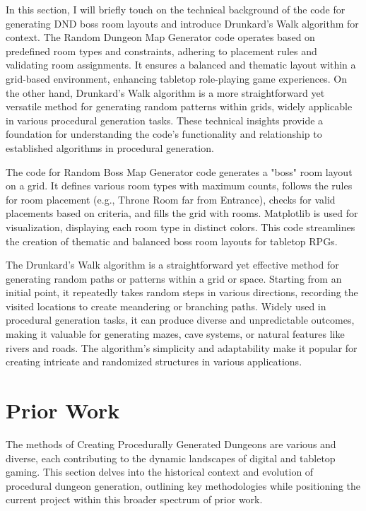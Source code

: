 \documentclass[10pt,twocolumn]{article}
\begin{document}
In this section, I will briefly touch on the technical background of the code for generating DND boss room layouts and introduce Drunkard's Walk algorithm for context. The Random Dungeon Map Generator code operates based on predefined room types and constraints, adhering to placement rules and validating room assignments. It ensures a balanced and thematic layout within a grid-based environment, enhancing tabletop role-playing game experiences. On the other hand, Drunkard's Walk algorithm is a more straightforward yet versatile method for generating random patterns within grids, widely applicable in various procedural generation tasks. These technical insights provide a foundation for understanding the code's functionality and relationship to established algorithms in procedural generation.
 
The code for Random Boss Map Generator code generates a "boss" room layout on a grid. It defines various room types with maximum counts, follows the rules for room placement (e.g., Throne Room far from Entrance), checks for valid placements based on criteria, and fills the grid with rooms. Matplotlib is used for visualization, displaying each room type in distinct colors. This code streamlines the creation of thematic and balanced boss room layouts for tabletop RPGs.

The Drunkard's Walk algorithm is a straightforward yet effective method for generating random paths or patterns within a grid or space. Starting from an initial point, it repeatedly takes random steps in various directions, recording the visited locations to create meandering or branching paths. Widely used in procedural generation tasks, it can produce diverse and unpredictable outcomes, making it valuable for generating mazes, cave systems, or natural features like rivers and roads. The algorithm's simplicity and adaptability make it popular for creating intricate and randomized structures in various applications.


\section{Prior Work}

The methods of Creating Procedurally Generated Dungeons are various and diverse, each contributing to the dynamic landscapes of digital and tabletop gaming. This section delves into the historical context and evolution of procedural dungeon generation, outlining key methodologies while positioning the current project within this broader spectrum of prior work.
\end{document}
